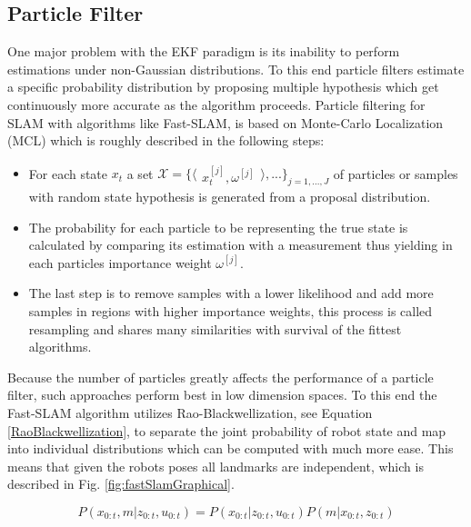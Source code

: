 \subsection{Particle Filter}
One major problem with the EKF paradigm is its inability to perform estimations under non-Gaussian distributions. 
To this end particle filters estimate a specific probability distribution by proposing multiple hypothesis which get continuously more accurate as the algorithm proceeds. 
Particle filtering for SLAM with algorithms like Fast-SLAM, is based on Monte-Carlo Localization (MCL) which is roughly described in the following steps:
\begin{itemize}
	\item For each state $ x_{t} $ a set 
	$
	\mathcal{X} = 
	\{ 
	\langle
	\begin{matrix}
		 x_{t}^{[j]},  \omega^{[j]}
	\end{matrix}
	\rangle
	, ...
	\}
	_{j=1, ..., J}
	$
	of particles or samples 
	with random state hypothesis is generated from a proposal distribution. %
	\item The probability for each particle to be representing the true state is calculated by comparing its estimation with a measurement thus yielding in each particles importance weight $ \omega^{[j]} $.
	\item The last step is to remove samples with a lower likelihood and add more samples in regions with higher importance weights, this process is called resampling and shares many similarities with survival of the fittest algorithms.
\end{itemize}

Because the number of particles greatly affects the performance of a particle filter, such approaches perform best in low dimension spaces. To this end the Fast-SLAM algorithm utilizes Rao-Blackwellization, see Equation \ref{RaoBlackwellization}, to separate the joint probability of robot state and map into individual distributions which can be computed with much more ease.
This means that given the robots poses all landmarks are independent, which is described in Fig. \ref{fig:fastSlamGraphical}.

\begin{equation}\label{RaoBlackwellization}
	P(x_{0:t}, m | z_{0:t}, u_{0:t}) = P(x_{0:t} | z_{0:t}, u_{0:t}) P(m | x_{0:t}, z_{0:t})
\end{equation}


